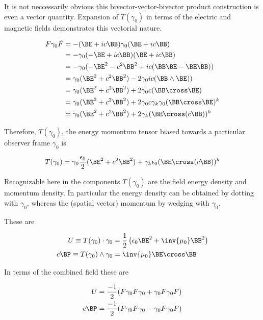 \documentclass[]{eliblog}
\begin{document}
It is not neccessarily obvious this bivector-vector-bivector product construction is even a vector quantity.
Expansion of $T(\gamma_0)$ in terms of
the electric and magnetic fields
demonstrates this vectorial nature.

\begin{align*}
F \gamma_0 \tilde{F}
&=
-(\BE + i c \BB) \gamma_0 (\BE + i c \BB) \\
&=
-\gamma_0 (-\BE + i c \BB) (\BE + i c \BB) \\
&=
-\gamma_0 (-\BE^2 - c^2 \BB^2 + i c (\BB \BE - \BE \BB) ) \\
&=
\gamma_0 (\BE^2 + c^2 \BB^2) - 2 \gamma_0 i c (\BB \wedge \BE) ) \\
&=
\gamma_0 (\BE^2 + c^2 \BB^2) + 2 \gamma_0 c (\BB \cross \BE) \\
&=
\gamma_0 (\BE^2 + c^2 \BB^2) + 2 \gamma_0 c \gamma_k \gamma_0 (\BB \cross \BE)^k \\
&=
\gamma_0 (\BE^2 + c^2 \BB^2) + 2 \gamma_k (\BE \cross (c \BB))^k \\
\end{align*}

Therefore, $T(\gamma_0)$, the energy momentum tensor biased towards a particular observer frame $\gamma_0$
is

\begin{align}
T(\gamma_0)
&=
\gamma_0 \frac{\epsilon_0}{2} (\BE^2 + c^2 \BB^2) + \gamma_k \epsilon_0 (\BE \cross (c \BB))^k \\
\end{align}

Recognizable here in the components $T(\gamma_0)$ are the field energy density and momentum density.  In particular
the energy density can be obtained by dotting with $\gamma_0$, whereas the (spatial vector) momentum by wedging with
$\gamma_0$.

These are

\begin{align}
U \equiv T(\gamma_0) \cdot \gamma_0 &= \frac{1}{2} \left( \epsilon_0 \BE^2 + \inv{\mu_0} \BB^2 \right) \\
c \BP \equiv T(\gamma_0) \wedge \gamma_0 &= \inv{\mu_0} \BE \cross \BB
\end{align}

In terms of the combined field these are

\begin{align}
U &= \frac{-1}{2}( F \gamma_0 F \gamma_0 + \gamma_0 F \gamma_0 F) \\
c \BP &= \frac{-1}{2}( F \gamma_0 F \gamma_0 - \gamma_0 F \gamma_0 F)
\end{align}
\end{document}
